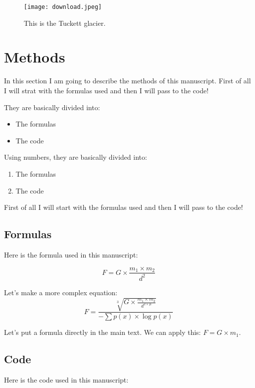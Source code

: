 \documentclass[a4paper,12pt]{article}
\begin{document}

\begin{figure}
\centering
    \texttt{[image: download.jpeg]}
    \caption{This is the Tuckett glacier.}
    \label{fig:brenta}
\end{figure}


\section{Methods}
In this section I am going to describe the methods of this manuscript. First of all I will strat with the formulas used and then I will pass to the code!

They are basically divided into:
\begin{itemize}
    \item The formulas
    \item The code
\end{itemize}

Using numbers, they are basically divided into:

\begin{enumerate}
    \item The formulas
    \item The code
\end{enumerate}

First of all I will start with the formulas used and then I will  pass to the code!

\subsection{Formulas}
Here is the formula used in this manuscript:

\begin{equation}
    F = G  \times \frac{m_{1} \times m_{2}}{d^2}
    \label{eq:newton}
\end{equation}

Let's make a more complex equation:
\begin{equation}
    F = \frac{\sqrt[3]{G \times \frac{m_{1} \times m_{2}}{d^{2 \times \mu}}}}{-\sum{p(x) \times \log{p(x)}}}
\end{equation}

Let's put a formula directly in the main text. We can apply this: $F=G \times m_{1}$.

\subsection{Code}
Here is the code used in this manuscript:

\end{document}

